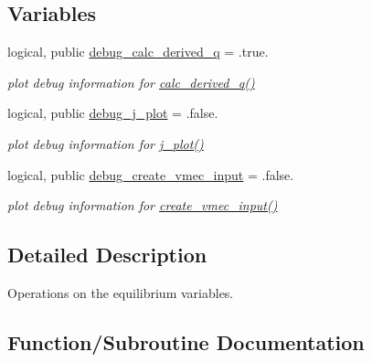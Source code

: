 \subsection*{Variables}
\begin{DoxyCompactItemize}
\item 
logical, public \hyperlink{namespaceeq__ops_a1b6609a8d8b427d9133bf323e732f209}{debug\+\_\+calc\+\_\+derived\+\_\+q} = .true.
\begin{DoxyCompactList}\small\item\em plot debug information for \hyperlink{namespaceeq__ops_a087e08ce6d8ad381b5bac8fc51148d50}{calc\+\_\+derived\+\_\+q()} \end{DoxyCompactList}\item 
logical, public \hyperlink{namespaceeq__ops_a45ba7f46fd439bbd73edfd1fd548b58e}{debug\+\_\+j\+\_\+plot} = .false.
\begin{DoxyCompactList}\small\item\em plot debug information for \hyperlink{namespaceeq__ops_afabdf28e5c26ceb87e6eb8cf3809919d}{j\+\_\+plot()} \end{DoxyCompactList}\item 
logical, public \hyperlink{namespaceeq__ops_a07ca60790a262e20bc8632be1530970a}{debug\+\_\+create\+\_\+vmec\+\_\+input} = .false.
\begin{DoxyCompactList}\small\item\em plot debug information for \hyperlink{namespaceeq__ops_a9addef683b3d4a8c587510e4c994ec61}{create\+\_\+vmec\+\_\+input()} \end{DoxyCompactList}\end{DoxyCompactItemize}


\subsection{Detailed Description}
Operations on the equilibrium variables. 

\subsection{Function/\+Subroutine Documentation}
\mbox{\label{namespaceeq__ops_a73a8c3cea1e8a636b4978bc626e0fab0}} 

